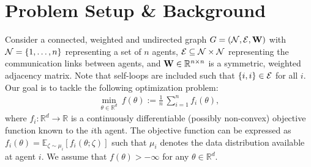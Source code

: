 \documentclass[10pt]{article} %
\newcommand{\revision}{}
\theoremstyle{plain}
\theoremstyle{definition}
\theoremstyle{remark}
\newcommand{\W}{{\bf W}}
\begin{document}
\section{Problem Setup \& Background}
Consider a {\revision connected}, weighted and undirected graph $G = ( {\cal N} , {\cal E} , \W )$ with ${\cal N} = \{1,\ldots,n\}$ representing a set of $n$ agents, ${\cal E} \subseteq {\cal N} \times {\cal N}$ representing the communication links between agents, and $\W \in \mathbb{R}^{n \times n}$ is a symmetric, weighted adjacency matrix. Note that self-loops are included such that $\{i,i\} \in {\cal E}$ for all $i$. 
Our goal is to tackle the following optimization problem:
\begin{align}
\min_{ \theta \in \mathbb{R}^d }~f(\theta) := \frac{1}{n} \, \sum_{i=1}^n f_i(\theta), \label{eq:opt}
\end{align} 
where $f_i : \mathbb{R}^d \rightarrow \mathbb{R}$ is a continuously differentiable (possibly non-convex) objective function known to the $i$th agent. The objective function can be expressed as $f_i(\theta) = \mathbb{E}_{ \zeta \sim \mu_i } [ f_i( \theta; \zeta ) ]$ such that $\mu_i$ denotes the data distribution available at agent $i$. We assume that $f(\theta) > -\infty$ for any $\theta \in \mathbb{R}^d$.
\end{document}
